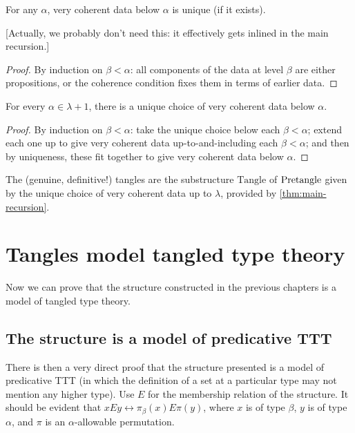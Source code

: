\begin{lemma}
  \label{lem:very-coherent-data-unique}
  For any $\alpha$, very coherent data below $\alpha$ is unique (if it exists).

  [Actually, we probably don’t need this: it effectively gets inlined in the main recursion.]
\end{lemma}
\begin{proof}
  By induction on $\beta < \alpha$: all components of the data at level $\beta$ are either propositions, or the coherence condition fixes them in terms of earlier data.
\end{proof}

\begin{theorem}
  \label{thm:main-recursion}
    For every $\alpha \in \lambda + 1$, there is a unique choice of very coherent data below $\alpha$.
\end{theorem}
\begin{proof}
  By induction on $\beta < \alpha$: take the unique choice below each $\beta < \alpha$; extend each one up to give very coherent data up-to-and-including each $\beta < \alpha$; and then by uniqueness, these fit together to give very coherent data below $\alpha$.
\end{proof}

\newcommand{\Tangle}{\mathrm{Tangle}}
\begin{definition}
  \label{def:tangle-completed}
  The (genuine, definitive!) tangles are the substructure $\Tangle$ of $\mathrm{Pretangle}$ given by the unique choice of very coherent data up to $\lambda$, provided by \cref{thm:main-recursion}.
\end{definition}

\newpage

\chapter{Tangles model tangled type theory}

Now we can prove that the structure constructed in the previous chapters is a model of tangled type theory.

\section{The structure is a model of predicative TTT}

There is then a very direct proof that the structure presented is a model of predicative TTT (in which the definition of a set at a particular type may not mention any higher type).  Use $E$ for the membership relation of the structure.  It should be evident that $x E y \leftrightarrow \pi_\beta(x) E \pi(y)$,
where $x$ is of type $\beta$, $y$ is of type $\alpha$, and $\pi$ is an $\alpha$-allowable permutation.

